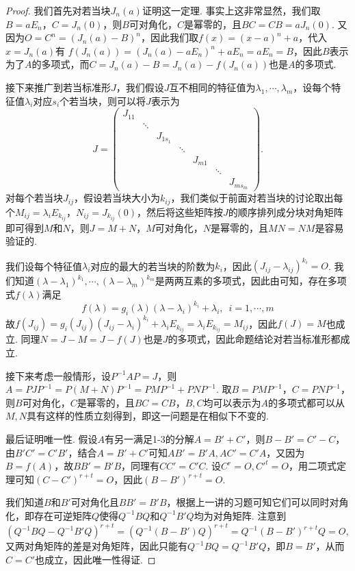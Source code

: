 \begin{proof}
    我们首先对若当块$J_n(a)$证明这一定理. 事实上这非常显然，我们取$B=aE_n$，$C=J_n(0)$，则$B$可对角化，$C$是幂零的，且$BC=CB=aJ_n(0)$. 又因为$O=C^n=(J_n(a)-B)^n$，因此我们取$f(x)=(x-a)^n+a$，代入$x=J_n(a)$有
    $f(J_n(a))=(J_n(a)-aE_n)^n+aE_n=aE_n=B$，因此$B$表示为了$A$的多项式，而$C=J_n(a)-B=J_n(a)-f(J_n(a))$也是$A$的多项式.

    接下来推广到若当标准形$J$，我们假设$J$互不相同的特征值为$\lambda_1,\cdots,\lambda_m$，设每个特征值$\lambda_i$对应$s_i$个若当块，则可以将$J$表示为
    \[J=\begin{pmatrix}
            J_{11} &        &          &        &        &        &          \\
                   & \ddots &          &        &        &        &          \\
                   &        & J_{1s_1} &        &        &        &          \\
                   &        &          & \ddots &        &        &          \\
                   &        &          &        & J_{m1} &        &          \\
                   &        &          &        &        & \ddots &          \\
                   &        &          &        &        &        & J_{ms_m}
        \end{pmatrix}.\]
    对每个若当块$J_{ij}$，假设若当块大小为$k_{ij}$，我们类似于前面对若当块的讨论取出每个$M_{ij}=\lambda_i E_{k_{ij}}$，$N_{ij}=J_{k_{ij}}(0)$，然后将这些矩阵按$J$的顺序排列成分块对角矩阵即可得到$M$和$N$，则$J=M+N$，$M$可对角化，$N$是幂零的，且$MN=NM$是容易验证的.

    我们设每个特征值$\lambda_i$对应的最大的若当块的阶数为$k_i$，因此$(J_{ij}-\lambda_{ij})^{k_i}=O$. 我们知道$(\lambda-\lambda_1)^{k_1},\cdots,(\lambda-\lambda_m)^{k_m}$是两两互素的多项式，因此由可知，存在多项式$f(\lambda)$满足
    \[f(\lambda)=g_i(\lambda)(\lambda-\lambda_i)^{k_i}+\lambda_i,\enspace i=1,\cdots,m\]
    故$f(J_{ij})=g_i(J_{ij})(J_{ij}-\lambda_i)^{k_i}+\lambda_iE_{k_{ij}}=\lambda_iE_{k_{ij}}=M_{ij}$，因此$f(J)=M$也成立. 同理$N=J-M=J-f(J)$也是$J$的多项式，因此命题结论对若当标准形都成立.

    接下来考虑一般情形，设$P^{-1}AP=J$，则$A=PJP^{-1}=P(M+N)P^{-1}=PMP^{-1}+PNP^{-1}$. 取$B=PMP^{-1}$，$C=PNP^{-1}$，则$B$可对角化，$C$是幂零的，且$BC=CB$，$B,C$均可以表示为$A$的多项式都可以从$M,N$具有这样的性质立刻得到，即这一问题是在相似下不变的.

    最后证明唯一性. 假设$A$有另一满足1-3的分解$A=B'+C'$，则$B-B'=C'-C$，由$B'C'=C'B'$，结合$A=B'+C'$可知$AB'=B'A,AC'=C'A$，又因为$B=f(A)$，故$BB'=B'B$，同理有$CC'=C'C$. 设$C^r=O,C'^t=O$，用二项式定理可知$(C-C')^{r+t}=O$，因此$(B-B')^{r+t}=O$.

    我们知道$B$和$B'$可对角化且$BB'=B'B$，根据上一讲的习题可知它们可以同时对角化，即存在可逆矩阵$Q$使得$Q^{-1}BQ$和$Q^{-1}B'Q$均为对角矩阵. 注意到
    \[(Q^{-1}BQ-Q^{-1}B'Q)^{r+t}=(Q^{-1}(B-B')Q)^{r+t}=Q^{-1}(B-B')^{r+t}Q=O,\]
    又两对角矩阵的差是对角矩阵，因此只能有$Q^{-1}BQ=Q^{-1}B'Q$，即$B=B'$，从而$C=C'$也成立，因此唯一性得证.
\end{proof}


